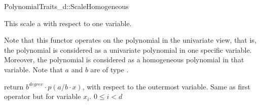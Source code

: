 \begin{ccRefConcept}{PolynomialTraits_d::ScaleHomogeneous}
\ccDefinition

This  scale a 
 with respect to one variable. 

Note that this functor operates on the polynomial in the univariate view, that is, 
the polynomial is considered as a univariate polynomial in one specific variable. 
Moreover, the polynomial is considered as a homogeneous polynomial in that variable.
Note that $a$ and $b$ are of type .


\ccRefines 
{}

\ccTypes


\ccOperations
{}
         { return $b^{degree}\cdot p(a/b\cdot x)$, with respect to the outermost variable. }
         { Same as first operator but for variable $x_i$. 
\ccPrecond $0 \leq i  < d$
         }


\ccSeeAlso

\\
\\

\end{ccRefConcept}